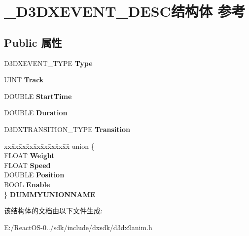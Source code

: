 \hypertarget{struct___d3_d_x_e_v_e_n_t___d_e_s_c}{}\section{\+\_\+\+D3\+D\+X\+E\+V\+E\+N\+T\+\_\+\+D\+E\+S\+C结构体 参考}
\label{struct___d3_d_x_e_v_e_n_t___d_e_s_c}
\subsection*{Public 属性}
\begin{DoxyCompactItemize}
\item 
\mbox{\label{struct___d3_d_x_e_v_e_n_t___d_e_s_c_a289a07d778dea27e29aec3d2fc178c72}} 
D3\+D\+X\+E\+V\+E\+N\+T\+\_\+\+T\+Y\+PE {\bfseries Type}
\item 
\mbox{\label{struct___d3_d_x_e_v_e_n_t___d_e_s_c_aa8437e4b43fc18b5e7c9879ed8da5742}} 
U\+I\+NT {\bfseries Track}
\item 
\mbox{\label{struct___d3_d_x_e_v_e_n_t___d_e_s_c_a549c5afb9963d39d1748d68400e950e4}} 
D\+O\+U\+B\+LE {\bfseries Start\+Time}
\item 
\mbox{\label{struct___d3_d_x_e_v_e_n_t___d_e_s_c_a9853cbef20110392134e70582abb3ae5}} 
D\+O\+U\+B\+LE {\bfseries Duration}
\item 
\mbox{\label{struct___d3_d_x_e_v_e_n_t___d_e_s_c_a155e85b2ab0da42b75b4a3ea7edbc356}} 
D3\+D\+X\+T\+R\+A\+N\+S\+I\+T\+I\+O\+N\+\_\+\+T\+Y\+PE {\bfseries Transition}
\item 
\mbox{\label{struct___d3_d_x_e_v_e_n_t___d_e_s_c_ac6ef72c756245af46aa4b7251a44e32c}} 
\begin{tabbing}
xx\=xx\=xx\=xx\=xx\=xx\=xx\=xx\=xx\=\kill
union \{\\
\>FLOAT {\bfseries Weight}\\
\>FLOAT {\bfseries Speed}\\
\>DOUBLE {\bfseries Position}\\
\>BOOL {\bfseries Enable}\\
\} {\bfseries DUMMYUNIONNAME}\\

\end{tabbing}\end{DoxyCompactItemize}


该结构体的文档由以下文件生成\+:\begin{DoxyCompactItemize}
\item 
E\+:/\+React\+O\+S-\/0../sdk/include/dxsdk/d3dx9anim.\+h\end{DoxyCompactItemize}
